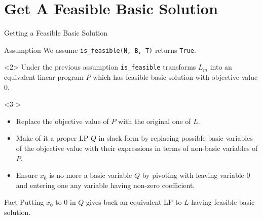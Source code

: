 \documentclass[32pt, aspectratio = 169]{beamer}
\begin{document}
\section{Get A Feasible Basic Solution}

\begin{frame}{Getting a Feasible Basic Solution}
  \begin{halfshyblock}{Assumption}
    We assume \texttt{is_feasible(N, B, T)} returns
    \texttt{True}.
  \end{halfshyblock}
  \vspace{.5\baselineskip}
  \begin{overlayarea}{\textwidth}{.6\textheight}
    \begin{onlyenv}<2>
      Under the previous assumption \texttt{is_feasible}
      transforms $L_m$ into an equivalent linear program $P$ which has
      feasible basic solution with objective value $0$.
    \end{onlyenv}
    \begin{onlyenv}<3->
      \begin{itemize}
      \item<3-> Replace the objective value of $P$ with the original one of $L$.
      \item<4-> Make of it a proper LP $Q$ in slack form by replacing
        possible basic variables of the objective value with their
        expressions in terms of non-basic variables of $P$.
      \item<5-> Ensure $x_0$ is no more a basic variable $Q$ by
        pivoting with leaving variable $0$ and entering one any
        variable having non-zero coefficient.
      \end{itemize}
      \pause[6]
      \vspace{.5\baselineskip}
      \begin{halfshyblock}{Fact}
        Putting $x_0$ to $0$ in $Q$ gives back an equivalent LP to $L$
        having feasible basic solution.
      \end{halfshyblock}
    \end{onlyenv}
  \end{overlayarea}
\end{frame}
\end{document}
